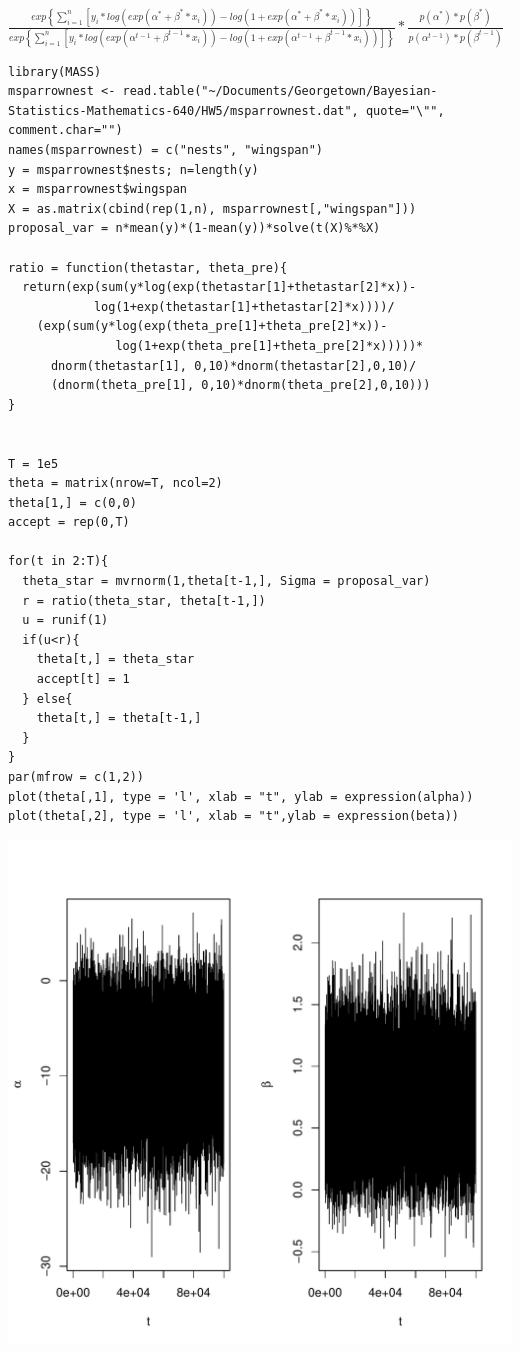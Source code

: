 \documentclass{article}\usepackage[]{graphicx}\usepackage[]{color}
\makeatletter
\newenvironment{kframe}{%
 \def\at@end@of@kframe{}%
 \ifinner\ifhmode%
  \def\at@end@of@kframe{\end{minipage}}%
  \begin{minipage}{\columnwidth}%
 \fi\fi%
 \def\FrameCommand##1{\hskip\@totalleftmargin \hskip-\fboxsep
 \colorbox{shadecolor}{##1}\hskip-\fboxsep
     \hskip-\linewidth \hskip-\@totalleftmargin \hskip\columnwidth}%
 \MakeFramed {\advance\hsize-\width
   \@totalleftmargin\z@ \linewidth\hsize
   \@setminipage}}%
 {\par\unskip\endMakeFramed%
 \at@end@of@kframe}
\newenvironment{knitrout}{}{} %
\makeatother
\begin{document}
$\frac{exp\left\{ \sum_{i=1}^{n}\left[y_{i}*log\left(exp(\alpha^{*}+\beta^{*}*x_{i})\right)-log\left(1+exp(\alpha^{*}+\beta^{*}*x_{i})\right)\right]\right\} }{exp\left\{ \sum_{i=1}^{n}\left[y_{i}*log\left(exp(\alpha^{t-1}+\beta^{t-1}*x_{i})\right)-log\left(1+exp(\alpha^{t-1}+\beta^{t-1}*x_{i})\right)\right]\right\} }*\frac{p(\alpha^{*})*p(\beta^{*})}{p(\alpha^{t-1})*p(\beta^{t-1})}$

\begin{knitrout}
\color{fgcolor}\begin{kframe}
\begin{verbatim}
library(MASS)
msparrownest <- read.table("~/Documents/Georgetown/Bayesian-Statistics-Mathematics-640/HW5/msparrownest.dat", quote="\"", comment.char="")
names(msparrownest) = c("nests", "wingspan")
y = msparrownest$nests; n=length(y)
x = msparrownest$wingspan
X = as.matrix(cbind(rep(1,n), msparrownest[,"wingspan"]))
proposal_var = n*mean(y)*(1-mean(y))*solve(t(X)%*%X)

ratio = function(thetastar, theta_pre){
  return(exp(sum(y*log(exp(thetastar[1]+thetastar[2]*x))-
            log(1+exp(thetastar[1]+thetastar[2]*x))))/
    (exp(sum(y*log(exp(theta_pre[1]+theta_pre[2]*x))-
               log(1+exp(theta_pre[1]+theta_pre[2]*x)))))*
      dnorm(thetastar[1], 0,10)*dnorm(thetastar[2],0,10)/
      (dnorm(theta_pre[1], 0,10)*dnorm(theta_pre[2],0,10)))
}
  

T = 1e5
theta = matrix(nrow=T, ncol=2)
theta[1,] = c(0,0)
accept = rep(0,T)

for(t in 2:T){
  theta_star = mvrnorm(1,theta[t-1,], Sigma = proposal_var)
  r = ratio(theta_star, theta[t-1,])
  u = runif(1)
  if(u<r){
    theta[t,] = theta_star
    accept[t] = 1
  } else{
    theta[t,] = theta[t-1,]
  }
}
par(mfrow = c(1,2))
plot(theta[,1], type = 'l', xlab = "t", ylab = expression(alpha))
plot(theta[,2], type = 'l', xlab = "t",ylab = expression(beta))
\end{verbatim}
\end{kframe}
\includegraphics[width=0.50\linewidth]{figure/unnamed-chunk-9-1} 

\end{knitrout}
\end{document}

